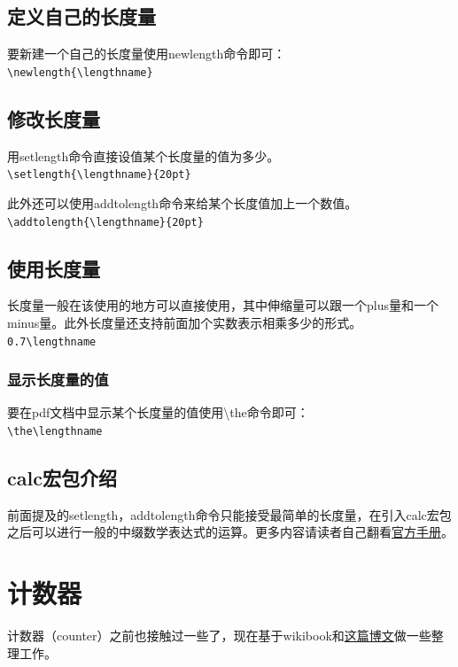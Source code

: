 \documentclass[12pt,oneside]{book}
\begin{document}
\begin{common-format}
 
\subsection{定义自己的长度量}
要新建一个自己的长度量使用newlength命令即可：\\
\verb+\newlength{\lengthname}+

\subsection{修改长度量}
用setlength命令直接设值某个长度量的值为多少。\\
\verb+\setlength{\lengthname}{20pt}+

此外还可以使用addtolength命令来给某个长度值加上一个数值。\\
\verb+\addtolength{\lengthname}{20pt}+

\subsection{使用长度量}
长度量一般在该使用的地方可以直接使用，其中伸缩量可以跟一个plus量和一个minus量。此外长度量还支持前面加个实数表示相乘多少的形式。\\
\verb+0.7\lengthname+

\subsubsection{显示长度量的值}
要在pdf文档中显示某个长度量的值使用\textbackslash the命令即可：\\
\verb+\the\lengthname+

\subsection{calc宏包介绍}
前面提及的setlength，addtolength命令只能接受最简单的长度量，在引入calc宏包之后可以进行一般的中缀数学表达式的运算。更多内容请读者自己翻看\href{http://mirrors.ctan.org/macros/latex/required/tools/calc.pdf}{官方手册}。




\section{计数器}
计数器（counter）之前也接触过一些了，现在基于wikibook和\href{http://texblog.org/2007/07/25/counters-in-latex/}{这篇博文}做一些整理工作。



\end{common-format}
\end{document}
